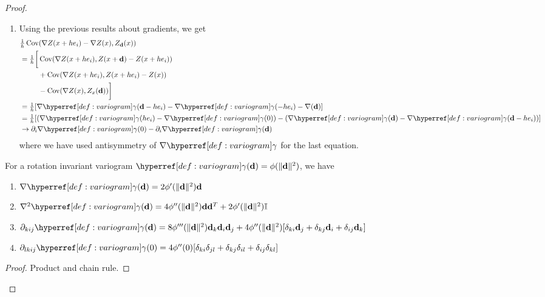 \begin{proof}
\begin{enumerate}[wide]
	\item Using the previous results about gradients, we get
	\begin{align*}
		&\tfrac1h\Cov(\grad Z(x+h e_i) -\grad Z(x), Z_\step(x))\\
		&= \tfrac1h\begin{aligned}[t]
			\bigg[&\Cov(\grad Z(x+h e_i), Z(x+\step) - Z(x+h e_i))\\
			&+ \Cov(\grad Z(x+h e_i), Z(x+h e_i) - Z(x))\\
			&- \Cov(\grad Z(x), Z_x(\step))\bigg]
		\end{aligned}
		\\
		&= \tfrac1h[\grad\variogram(\step - h e_i) - \grad\variogram(-h e_i) - \grad(\step)]\\
		&= \tfrac1h[(\grad\variogram(h e_i) - \grad\variogram(0)) -(\grad\variogram(\step) - \grad\variogram(\step -h e_i))]\\
		&\to \partial_i\grad\variogram(0) - \partial_i\grad\variogram(\step)
	\end{align*}
	where we have used antisymmetry of \(\grad\variogram\) for the last equation.
	\qedhere

	\end{enumerate}

	\begin{lemma}
	\label{lem: derivatives of rotation invariant variograms}
		For a rotation invariant variogram \(\variogram(\step) = \phi(\|\step\|^2)\),
		we have
		\begin{enumerate}
			\item
			\(\grad \variogram(\step) = 2\phi'(\|\step\|^2) \step\)
			\item
			\(\grad^2 \variogram(\step)
			= 4 \phi''(\|\step\|^2) \step \step^T + 2\phi'(\|\step\|^2)\identity\)
			\item
			\(\partial_{kij}\variogram(\step) = 8\phi'''(\|\step\|^2)\step_k\step_i\step_j
			+ 4\phi''(\|\step\|^2)[\delta_{ki}\step_j + \delta_{kj}\step_i + \delta_{ij}\step_k]
			\)
			\item
			\(\partial_{lkij}\variogram(0)
			= 4\phi''(0)[\delta_{ki}\delta_{jl} + \delta_{kj}\delta_{il} + \delta_{ij}\delta_{kl}]\)
		\end{enumerate}
	\end{lemma}
	\begin{proof}
		Product and chain rule.
	\end{proof}

\end{proof}
